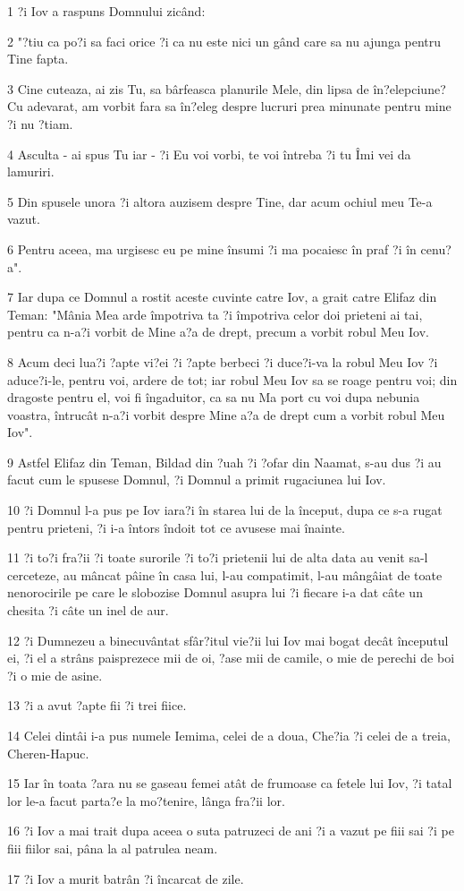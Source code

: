 \par 1 ?i Iov a raspuns Domnului zicând:
\par 2 "?tiu ca po?i sa faci orice ?i ca nu este nici un gând care sa nu ajunga pentru Tine fapta.
\par 3 Cine cuteaza, ai zis Tu, sa bârfeasca planurile Mele, din lipsa de în?elepciune? Cu adevarat, am vorbit fara sa în?eleg despre lucruri prea minunate pentru mine ?i nu ?tiam.
\par 4 Asculta - ai spus Tu iar - ?i Eu voi vorbi, te voi întreba ?i tu Îmi vei da lamuriri.
\par 5 Din spusele unora ?i altora auzisem despre Tine, dar acum ochiul meu Te-a vazut.
\par 6 Pentru aceea, ma urgisesc eu pe mine însumi ?i ma pocaiesc în praf ?i în cenu?a".
\par 7 Iar dupa ce Domnul a rostit aceste cuvinte catre Iov, a grait catre Elifaz din Teman: "Mânia Mea arde împotriva ta ?i împotriva celor doi prieteni ai tai, pentru ca n-a?i vorbit de Mine a?a de drept, precum a vorbit robul Meu Iov.
\par 8 Acum deci lua?i ?apte vi?ei ?i ?apte berbeci ?i duce?i-va la robul Meu Iov ?i aduce?i-le, pentru voi, ardere de tot; iar robul Meu Iov sa se roage pentru voi; din dragoste pentru el, voi fi îngaduitor, ca sa nu Ma port cu voi dupa nebunia voastra, întrucât n-a?i vorbit despre Mine a?a de drept cum a vorbit robul Meu Iov".
\par 9 Astfel Elifaz din Teman, Bildad din ?uah ?i ?ofar din Naamat, s-au dus ?i au facut cum le spusese Domnul, ?i Domnul a primit rugaciunea lui Iov.
\par 10 ?i Domnul l-a pus pe Iov iara?i în starea lui de la început, dupa ce s-a rugat pentru prieteni, ?i i-a întors îndoit tot ce avusese mai înainte.
\par 11 ?i to?i fra?ii ?i toate surorile ?i to?i prietenii lui de alta data au venit sa-l cerceteze, au mâncat pâine în casa lui, l-au compatimit, l-au mângâiat de toate nenorocirile pe care le slobozise Domnul asupra lui ?i fiecare i-a dat câte un chesita ?i câte un inel de aur.
\par 12 ?i Dumnezeu a binecuvântat sfâr?itul vie?ii lui Iov mai bogat decât începutul ei, ?i el a strâns paisprezece mii de oi, ?ase mii de camile, o mie de perechi de boi ?i o mie de asine.
\par 13 ?i a avut ?apte fii ?i trei fiice.
\par 14 Celei dintâi i-a pus numele Iemima, celei de a doua, Che?ia ?i celei de a treia, Cheren-Hapuc.
\par 15 Iar în toata ?ara nu se gaseau femei atât de frumoase ca fetele lui Iov, ?i tatal lor le-a facut parta?e la mo?tenire, lânga fra?ii lor.
\par 16 ?i Iov a mai trait dupa aceea o suta patruzeci de ani ?i a vazut pe fiii sai ?i pe fiii fiilor sai, pâna la al patrulea neam.
\par 17 ?i Iov a murit batrân ?i încarcat de zile.


